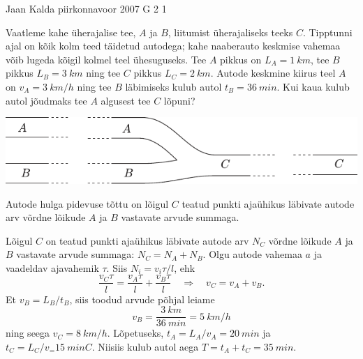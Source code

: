 {Jaan Kalda} %
{piirkonnavoor} %
{2007} %
{G 2} %
{1} %
{
\ifStatement
Vaatleme kahe üherajalise tee, $A$ ja $B$, liitumist üherajaliseks teeks $C$. Tipptunni ajal on kõik kolm teed täidetud autodega; kahe naaberauto keskmise vahemaa võib lugeda kõigil kolmel teel ühesuguseks. Tee $A$ pikkus on $L_A = \SI{1}{km}$, tee $B$ pikkus $L_B = \SI{3}{km}$ ning tee $C$ pikkus $L_C = \SI{2}{km}$. Autode keskmine kiirus teel $A$ on $v_A = \SI{3}{km/h}$ ning tee $B$ läbimiseks kulub autol $t_B = \SI{36}{min}$. Kui kaua kulub autol jõudmaks tee $A$ algusest tee $C$ lõpuni?
\begin{center}
	\includegraphics[width=0.9\linewidth]{2007-v2g-02-yl}
\end{center}
\fi


\ifHint
Autode hulga pidevuse tõttu on lõigul $C$ teatud punkti ajaühikus läbivate autode arv võrdne lõikude $A$ ja $B$ vastavate arvude summaga.
\fi


\ifSolution
Lõigul $C$ on teatud punkti ajaühikus läbivate autode arv $N_C$ võrdne lõikude $A$ ja $B$ vastavate arvude summaga: $N_C = N_A + N_B$. Olgu autode vahemaa $a$ ja vaadeldav ajavahemik $\tau$. Siis $N_i = v_i\tau /l$, ehk 
\[
\frac{v_{C} \tau}{l}=\frac{v_{A} \tau}{l}+\frac{v_{B} \tau}{l} \quad \Rightarrow \quad v_{C}=v_{A}+v_{B}.
\]
Et $v_B = L_B/t_B$, siis toodud arvude põhjal leiame 
\[
v_{B}=\frac{\SI{3}{km}}{\SI{36}{min}}=\SI{5}{km/h}
\]
ning seega $v_C = \SI{8}{km/h}$. Lõpetuseks, $t_A = L_A/v_A=\SI{20}{min}$ ja $t_C = L_C/v_ = \SI{15}{min}C$. Niisiis kulub autol aega $T = t_A + t_C = \SI{35}{min}$.
\fi
}